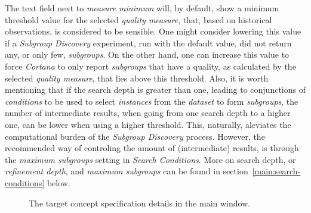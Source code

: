 \documentclass{article}
\begin{document}
The text field next to \emph{measure minimum} will, by default, show a minimum threshold value for the selected \emph{quality measure}, that, based on historical observations, is considered to be sensible.
One might consider lowering this value if a \emph{Subgroup Discovery} experiment, run with the default value, did not return any, or only few, \emph{subgroups}.
On the other hand, one can increase this value to force \emph{Cortana} to only report \emph{subgroups} that have a quality, as calculated by the selected \emph{quality measure}, that lies above this threshold.
Also, it is worth mentioning that if the search depth is greater than one, leading to conjunctions of \emph{conditions} to be used to select \emph{instances} from the \emph{dataset} to form \emph{subgroups}, the number of intermediate results, when going from one search depth to a higher one, can be lower when using a higher threshold.
This, naturally, aleviates the computational burden of the \emph{Subgroup Discovery} process.
However, the recommended way of controling the amount of (intermediate) results, is through the \emph{maximum subgroups} setting in \emph{Search Conditions}.
More on search depth, or \emph{refinement depth}, and \emph{maximum subgroups} can be found in section~\ref{main:search-conditions} below.

\begin{figure}
\begin{center}
\centering
{}
\caption{The target concept specification details in the main window.}
\end{center}
\label{fig:targetconcept}
\end{figure}

\end{document}
